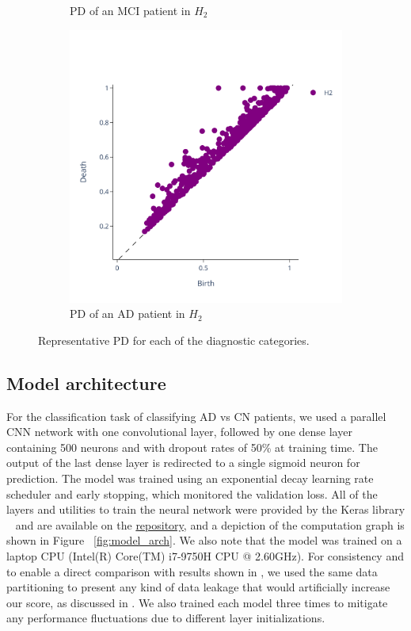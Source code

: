 \documentclass{article}
\begin{document}
\begin{figure}
\begin{subfigure}{0.32\textwidth}
    \caption{PD of an MCI patient in $H_2$}
  \end{subfigure}
  \begin{subfigure}{0.32\textwidth}
    \includegraphics[width=\textwidth]{figures/PDs/persistence_diagram_AD_H_2.png}
    \caption{PD of an AD patient in $H_2$}
  \end{subfigure}
  \caption{Representative PD for each of the diagnostic categories.}
  \label{fig:sample_rep_pd}
\end{figure}


\subsection{Model architecture}\label{sec:model_arch}
For the classification task of classifying AD vs CN patients, we used a parallel
CNN network with one convolutional layer, followed by one dense layer containing 500 neurons and
with dropout rates of 50\% at training time. The output of the last dense layer is redirected to a
single sigmoid neuron for prediction. The model was trained using an exponential decay learning rate
scheduler and early stopping, which monitored the validation loss. All of the layers and utilities
to train the neural network were provided by the Keras library ~\citep{chollet2015keras} and are
available on the \href{https://github.com/pjhartout/TDA_ADNI_MLCB}{repository}, and a depiction of
the computation graph is shown in Figure ~\ref{fig:model_arch}. We also note that the model was
trained on a laptop CPU (Intel(R) Core(TM) i7-9750H CPU @ 2.60GHz). For consistency and to enable a
direct comparison with results shown in \citep{bruningk2020image}, we used the same data
partitioning to present any kind of data leakage that would artificially increase our score, as
discussed in \citet{wen2020convolutional}. We also trained each model three times to mitigate any
performance fluctuations due to different layer initializations.
\end{document}
